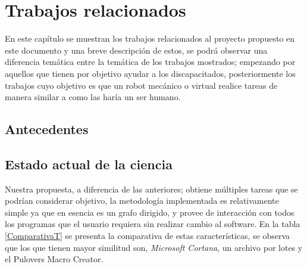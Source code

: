 
\chapter{Trabajos relacionados}
\label{sec:chapter2}

En este cap\'itulo se muestran los trabajos relacionados al proyecto propuesto
 en este documento y una breve descripci\'on de estos, se podr\'a observar una
 diferencia tem\'atica entre la tem\'atica de los trabajos mostrados; empezando 
 por aquellos que tienen por objetivo ayudar a los discapacitados, 
 posteriormente los trabajos cuyo objetivo es que un robot mec\'anico o virtual 
 realice tareas de manera similar a como las har\'ia un ser humano.
 

\section{Antecedentes}






\section{Estado actual de la ciencia}








Nuestra propuesta, a diferencia de las anteriores; obtiene m\'ultiples tareas
 que se podr\'ian considerar objetivo, la metodolog\'ia implementada es 
 relativamente simple ya que en esencia es un grafo dirigido, y provee de 
 interacci\'on con todos los programas que el usuario requiera sin realizar 
 cambio al software. En la tabla \ref{ComparativaT} se presenta la comparativa 
 de estas caracter\'isticas, se observa que los que tienen mayor similitud son, 
 \emph{Microsoft Cortana}, un archivo por lotes y el Pulover\textsc{}s Macro 
 Creator.


